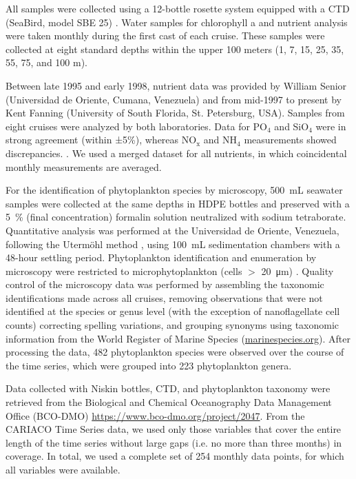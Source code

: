 \documentclass[draft]{agujournal2019}
\begin{document}
    All samples were collected using a 12-bottle rosette system equipped with a CTD (SeaBird, model SBE 25) \cite{astor_yrene_m_handbook_2013}. Water samples for chlorophyll a and nutrient analysis were taken monthly during the first cast of each cruise. These samples were collected at eight standard depths within the upper 100 meters (1, 7, 15, 25, 35, 55, 75, and 100 m). 

    Between late 1995 and early 1998, nutrient data was provided by William Senior (Universidad de Oriente, Cumana, Venezuela) and from mid-1997 to  present by Kent Fanning (University of South Florida, St. Petersburg, USA). Samples from eight cruises were analyzed by both laboratories. Data for PO$_4$ and SiO$_4$ were in strong agreement (within ±5\%), whereas  NO$_\text{x}$ and NH$_4$ measurements showed discrepancies. \cite{taylor_ecosystem_2012}. We used a merged dataset for all nutrients, in which coincidental monthly measurements are averaged.
       
    For the identification of phytoplankton species by microscopy, \qty{500}{\milli\liter} seawater samples were collected at the same depths in HDPE bottles and preserved with a \qty{5}{\%} (final concentration) formalin solution neutralized with sodium tetraborate. Quantitative analysis was performed at the Universidad de Oriente, Venezuela, following the Utermöhl method \cite{hasle1978inverted}, using \qty{100}{\milli\liter} sedimentation chambers with a 48-hour settling period. Phytoplankton identification and enumeration by microscopy were restricted to microphytoplankton (cells $>$ \qty{20}{\micro \meter}) \cite{mutshinda_environmental_2013}.
    Quality control of the microscopy data was performed by assembling the taxonomic identifications made across all cruises, removing observations that were not identified at the species or genus level (with the exception of nanoflagellate cell counts) correcting spelling variations, and grouping synonyms using taxonomic information from the World Register of Marine Species (\url{marinespecies.org}). After processing the data, 482 phytoplankton species were observed over the course of the time series, which were grouped into 223 phytoplankton genera.

    
    Data collected with Niskin bottles, CTD, and phytoplankton taxonomy were retrieved from the Biological and Chemical Oceanography Data Management Office (BCO-DMO) \url{https://www.bco-dmo.org/project/2047}. 
    From the CARIACO Time Series data, we used only those variables that cover the entire length of the time series without large gaps (i.e. no more than three months) in coverage. In total, we used a complete set of 254 monthly data points, for which all variables were available.
\end{document}
